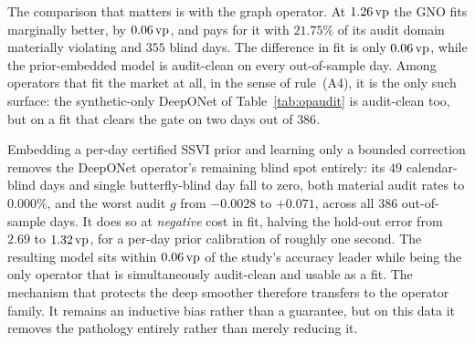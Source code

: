 The comparison that matters is with the graph operator. At $1.26\,\text{vp}$ the GNO fits marginally
better, by $0.06\,\text{vp}$, and pays for it with $21.75\%$ of its audit domain materially violating
and $355$ blind days. The difference in fit is only $0.06\,\text{vp}$, while the prior-embedded model
is audit-clean on every out-of-sample day. Among operators that fit the
market at all, in the sense of rule~(A4), it is the only such surface: the synthetic-only
DeepONet of Table~\ref{tab:opaudit} is audit-clean too, but on a fit that clears the gate on two
days out of $386$.

\begin{finding}
\label{find:prioroperator}
Embedding a per-day certified SSVI prior and learning only a bounded correction removes the
DeepONet operator's remaining blind spot entirely: its $49$ calendar-blind days and single
butterfly-blind day fall to zero, both material audit rates to $0.000\%$, and the worst audit
$g$ from $-0.0028$ to $+0.071$, across all $386$ out-of-sample days. It does so at
\emph{negative} cost in fit, halving the hold-out error from $2.69$ to $1.32\,\text{vp}$, for a
per-day prior calibration of roughly one second. The resulting model sits within $0.06\,\text{vp}$ of
the study's accuracy leader while being the only operator that is simultaneously audit-clean and
usable as a fit. The mechanism that protects the deep smoother therefore transfers to the
operator family. It remains an inductive bias rather than a guarantee, but on this data it
removes the pathology entirely rather than merely reducing it.
\end{finding}